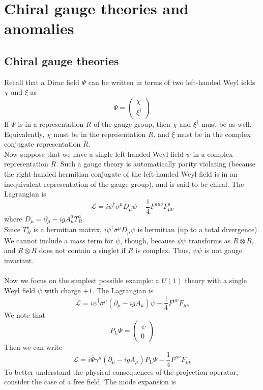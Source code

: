\section{Chiral gauge theories and anomalies}
\subsection{Chiral gauge theories}
Recall that a Dirac field $\Psi$ can be written in terms of two left-handed Weyl ields $\chi$ and $\xi$ as
\[\Psi = \begin{pmatrix}\chi\\ \xi^{\dagger} \end{pmatrix}\] If $\Psi$ is in a representation $R$ of the gauge group, then $\chi$ and $\xi^{\dagger}$ must be as well. Equivalently, $\chi$ must be in the representation $R$, and $\xi$ must be in the complex conjugate representation $\overline{R}$.
\\
Now suppose that we have a single left-handed Weyl field $\psi$ in a complex representation $R$. Such a gauge theory is automatically parity violating (because the right-handed hermitian conjugate of the left-handed Weyl field is in an inequivalent representation of the gauge group), and is said to be chiral.
The Lagrangian is
\[\mathcal{L} = i\psi^{\dagger} \overline{\sigma}^{\mu} D_{\mu} \psi - \frac{1}{4}F^{a\mu\nu}F^a_{\mu\nu}\]
where $D_{\mu} = \partial_{\mu} - igA^{a}_{\mu} T^a_R$.
\\
Since $T^a_R$ is a hermitian matrix, $i\psi^{\dagger} \overline{\sigma}^{\mu} D_{\mu} \psi$ is hermitian (up to a total divergence). We cannot include a mass term for $\psi$, though, because $\psi\psi$ transforms as $R \otimes R$, and $R \otimes R$ does not contain a singlet if $R$ is complex. Thus, $\psi\psi$ is not gauge invariant. 
\\ \\
Now we focus on the simplest possible example: a $U(1)$ theory with a single Weyl field $\psi$ with charge $+1$. The Lagrangian is
\[\mathcal{L} = i\psi^{\dagger} \overline{\sigma}^{\mu} (\partial_{\mu} - igA_{\mu}) \psi - \frac{1}{4}F^{\mu\nu}F_{\mu\nu}\]
We note that
\[P_{\mathrm{L}} \Psi = \begin{pmatrix}
\psi \\ 0
\end{pmatrix}\]
Then we can write
\[\mathcal{L} = i\overline{\Psi} \gamma^{\mu} (\partial_{\mu} - igA_{\mu}) P_{\mathrm{L}}\Psi - \frac{1}{4}F^{\mu\nu}F_{\mu\nu}\]
To better understand the physical consequences of the projection operator, consider the case of a free field. The mode expansion is
